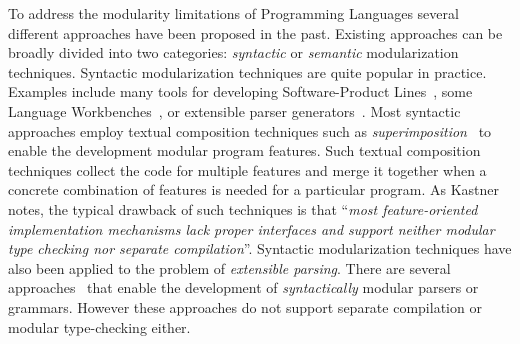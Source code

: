\begin{comment}
Most programming languages share alot of features in
common. 

For example, most languages have language constructs for:
binding (such as variables, functions, and function applications);
basic arithmetic operations; basic logic and conditional operations;
loops; as well as various other features. For each language construct,
various operations (such as evaluation, compilation, or parsing) need
to be implemented. It is reasonable to wonder whether we can simply
implement those features independently of a particular implementation
of a programming language. Evaluation could be defined independently 
for binding and arithmetic constructs. If the language to be
implemented is the pure lambda calculus, only evaluation of binding 
constructs is necessary. Thus only the component that implements 
evaluation for binding needs to be used in such an implementation.
However, more realistic programming languages 
will include arithmetic constructs, and will require an evaluation
function for those. 


Then it would be possible to \emph{reuse}
some of those features in \emph{multiple} different implementations of
programming languages. Essentially, this would enable a SPL for
programming languages, where all

A solution to the Expression Problem could ena



A concrete 
example that illustrates this issue is 
\end{comment}

To address the modularity limitations of Programming Languages several
different approaches have been proposed in the past. Existing
approaches can be broadly divided into two categories:
\emph{syntactic} or \emph{semantic} modularization
techniques. Syntactic modularization techniques are quite popular in
practice. Examples include many tools for developing Software-Product
Lines~\cite{}, some Language Workbenches~\cite{}, or extensible parser
generators~\cite{}.  Most syntactic approaches employ textual
composition techniques such as \emph{superimposition}~\cite{} to
enable the development modular program features. Such textual
composition techniques collect the code for multiple features and
merge it together when a concrete combination of features is needed
for a particular program. As Kastner~\cite{} notes, the typical
drawback of such techniques is that
``\emph{most feature-oriented implementation mechanisms lack proper
  interfaces and support neither modular type checking nor separate
  compilation}''. Syntactic modularization techniques have also
been applied to the problem of \emph{extensible parsing}. There are
several approaches~\cite{} that enable the development of
\emph{syntactically} modular parsers or grammars. However these
approaches do not support separate compilation or modular
type-checking either.

